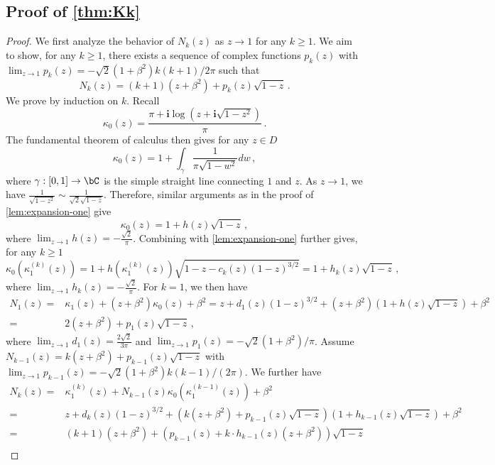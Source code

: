\documentclass[11pt]{article}
\newcommand{\g}{\kappa_1}
\renewcommand{\i}{\mathbf{i}}
\begin{document}
\subsection{Proof of \cref{thm:Kk}}\label{sec:NTK2}
\begin{proof}



We first analyze the behavior of $N_k(z)$ as $z\to 1$ for any $k\geq 1$. We aim to show, for any $k\geq 1$, there exists a sequence of complex functions $p_k(z)$ with $\lim_{z\to 1} p_k(z)=-\sqrt{2}(1+\beta^2)k(k+1)/2\pi$ such that
\begin{equation}\label{eq:Kk-around1}
    N_k(z) = (k+1)(z+\beta^2) + p_k(z)\sqrt{1-z}\,.
\end{equation}
We prove by induction on $k$. Recall 
\[\kappa_0(z) = \frac{ \pi +\i\log(z+\i\sqrt{1-z^2})}{\pi}\,.\]
The fundamental theorem of calculus then gives for any $z\in D$ \begin{equation*}
    \kappa_0(z) = 1 + \int_{\gamma} \frac{1}{\pi  \sqrt{1-w^2}} dw\,,
\end{equation*}
where $\gamma:[0,1]\to\bC$ is the simple straight line connecting $1$ and $z$. As $z\to 1$, we have $\frac{1}{\sqrt{1-z^2}}\sim \frac{1}{\sqrt{2}\sqrt{1-z}}$. Therefore, similar arguments as in the proof of \cref{lem:expansion-one} give \[
\kappa_0(z) = 1 +h(z) \sqrt{1- z}\,,
\]
where $\lim_{z\to 1} h(z) = -\frac{\sqrt{2}}{\pi }$. Combining with \cref{lem:expansion-one} further gives, for any $k\ge 1$
\[
\kappa_0(\g^{(k)}(z)) = 1 + h(\g^{(k)}(z))\sqrt{1-z-c_{k}(z)(1-z)^{3/2}} = 1 + h_k(z)\sqrt{1-z}\,,
\]
where $\lim_{z\to 1} h_k(z) = -\frac{\sqrt{2}}{\pi}$. For $k=1$, we then have
\begin{align*}
    N_1(z) ={}& \g(z) + (z+\beta^2)\kappa_0(z) + \beta^2
= z + d_1(z)(1-z)^{3/2} + (z + \beta^2)(1+ h(z)\sqrt{1-z}) + \beta^2\\
={}&  2(z+\beta^2) + p_1(z)\sqrt{1-z} \,,
\end{align*}
where $\lim_{z\to 1} d_1(z) = \frac{2\sqrt{2} }{3\pi} $ and $\lim_{z\to 1} p_1(z) = -\sqrt{2}(1+\beta^2)/\pi$. Assume $N_{k-1}(z) = k(z+\beta^2) + p_{k-1}(z)\sqrt{1-z}$ with $\lim_{z\to 1}p_{k-1}(z)=-\sqrt{2}(1+\beta^2)k(k-1)/(2\pi)$. We further have
\begin{align*}
    N_k(z) ={}& \g^{(k)}(z) + N_{k-1}(z)\kappa_0(\g^{(k-1)}(z)) + \beta^2\\
={}& z + d_k(z)(1-z)^{3/2} + \left(k(z+\beta^2) + p_{k-1}(z)\sqrt{1-z}\right)(1+h_{k-1}(z)\sqrt{1-z}) + \beta^2\\
={}& (k+1)(z+\beta^2) + (p_{k-1}(z) + k \cdot h_{k-1}(z)(z+\beta^2))\sqrt{1-z}\\

\end{align*}
\end{proof}
\end{document}

